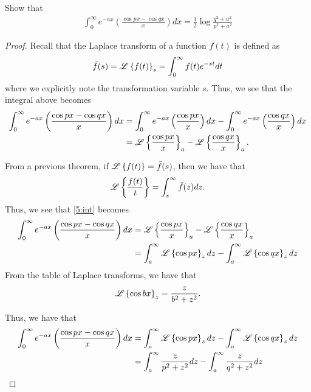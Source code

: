 \begin{problem}{5}
  Show that
  \begin{align*}
    \int_0^\infty e^{-ax} \left(\frac{\cos p x - \cos q x}{x}\right) dx = \frac{1}{2} \log \frac{q^2 + a^2}{p^2 + a^2}
  \end{align*}
\end{problem}

\begin{proof}
  Recall that the Laplace transform of a function $f(t)$ is defined as
  \begin{align*}
    \bar{f}(s) = \mathscr{L}\left\{ {f(t)} \right\}_s = \int_0^\infty f(t) e^{-st} dt
  \end{align*}
  where we explicitly note the transformation variable $s$.
  Thus, we see that the integral above becomes
  \begin{align}
    \label{5:int}
    \int_0^\infty e^{-ax} \left(\frac{\cos p x - \cos q x}{x}\right) dx &= \int_0^\infty e^{-ax} \left(\frac{\cos p x}{x}\right)dx - \int_0^\infty e^{-ax} \left(\frac{\cos q x}{x}\right) dx \notag \\
    &= \mathscr{L}\left\{ {\frac{\cos p x}{x}} \right\}_a - \mathscr{L}\left\{ {\frac{\cos q x}{x}} \right\}_a.
  \end{align}

  From a previous theorem, if $\mathscr{L}\left\{ {f(t)} \right\} = \bar{f}(s)$, then we have that
  \begin{align*}
    \mathscr{L}\left\{ {\frac{f(t)}{t}} \right\} = \int_s^\infty \bar{f}(z) dz.
  \end{align*}
  Thus, we see that \eqref{5:int} becomes
  \begin{align*}
    \int_0^\infty e^{-ax} \left(\frac{\cos p x - \cos q x}{x}\right) dx
    &= \mathscr{L}\left\{ {\frac{\cos p x}{x}} \right\}_a - \mathscr{L}\left\{ {\frac{\cos q x}{x}} \right\}_a \\
    &= \int_a^\infty \mathscr{L}\left\{ {\cos px} \right\}_z dz - \int_a^\infty \mathscr{L}\left\{ {\cos qx} \right\}_z dz
  \end{align*}
  From the table of Laplace transforms, we have that
  \begin{align*}
    \mathscr{L}\left\{ {\cos b x} \right\}_z = \frac{z}{b^2 + z^2}.
  \end{align*}

  Thus, we have that
  \begin{align*}
    \int_0^\infty e^{-ax} \left(\frac{\cos p x - \cos q x}{x}\right) dx
    &= \int_a^\infty \mathscr{L}\left\{ {\cos px} \right\}_z dz - \int_a^\infty \mathscr{L}\left\{ {\cos qx} \right\}_z dz\\
    &= \int_a^\infty \frac{z}{p^2 + z^2} dz - \int_a^\infty \frac{z}{q^2 + z^2} dz
  \end{align*}


\end{proof}
